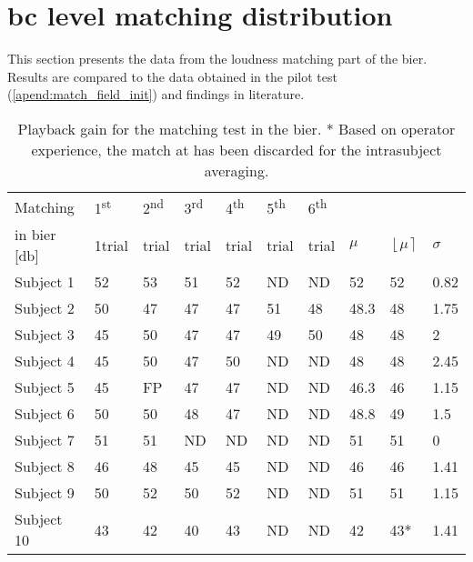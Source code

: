 \section{\gls{bc} level matching distribution}
This section presents the data from the loudness matching part of the \gls{bier}. 
Results are compared to the data obtained in the pilot test (\autoref{apend:match_field_init}) and findings in literature.



\begin{table}[H]
\centering
\caption{Playback gain for the matching test in the \gls{bier}. * Based on operator experience, the match at  has been discarded for the intrasubject averaging.}
\begin{tabular}{llllllllll}
\multicolumn{1}{l|}{Matching }   & 1\textsuperscript{st}  & 2\textsuperscript{nd}  & 3\textsuperscript{rd}  & 4\textsuperscript{th} & 5\textsuperscript{th}  & \multicolumn{1}{l|}{6\textsuperscript{th} }                &    & &  \\
\multicolumn{1}{l|}{in \gls{bier} [\si{\decibel}] }   & 1trial & trial &  trial &  trial &  trial & \multicolumn{1}{l|}{trial}                & $\mu$ & $\left \lfloor  \mu \right \rceil$  & $\sigma$ \\ \hline
\multicolumn{1}{l|}{Subject 1}  & 52    & 53    & 51    & 52    & ND    & \multicolumn{1}{l|}{ND} & 52  & 52 & 0.82  \\
\multicolumn{1}{l|}{Subject 2} & 50    & 47    & 47    & 47    & 51    & \multicolumn{1}{l|}{48} & 48.3 & 48 & 1.75 \\
\multicolumn{1}{l|}{Subject 3}  & 45    & 50    & 47    & 47    & 49    & \multicolumn{1}{l|}{50} & 48  & 48 & 2    \\
\multicolumn{1}{l|}{Subject 4}  & 45    & 50    & 47    & 50    & ND    & \multicolumn{1}{l|}{ND} & 48  &48 & 2.45  \\
\multicolumn{1}{l|}{Subject 5}  & 45    & FP    & 47    & 47    & ND    & \multicolumn{1}{l|}{ND} & 46.3 & 46 & 1.15  \\
\multicolumn{1}{l|}{Subject 6}  & 50    & 50    & 48    & 47    & ND    & \multicolumn{1}{l|}{ND} & 48.8 & 49 & 1.5   \\
\multicolumn{1}{l|}{Subject 7}  & 51    & 51    & ND    & ND    & ND    & \multicolumn{1}{l|}{ND} & 51 &  51& 0     \\
\multicolumn{1}{l|}{Subject 8}  & 46    & 48    & 45    & 45    & ND    & \multicolumn{1}{l|}{ND} & 46  & 46 & 1.41  \\
\multicolumn{1}{l|}{Subject 9}  & 50    & 52    & 50    & 52    & ND    & \multicolumn{1}{l|}{ND} & 51 & 51 & 1.15  \\
\multicolumn{1}{l|}{Subject 10}  & 43    & 42    & 40    & 43    & ND    & \multicolumn{1}{l|}{ND} & 42  & 43* & 1.41
\end{tabular}
\label{tab:match_bier} 
\end{table}
